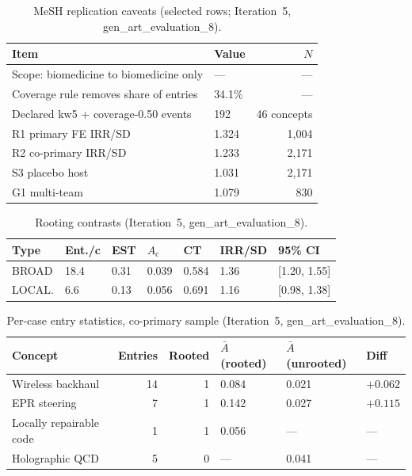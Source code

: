 \documentclass[11pt,letterpaper]{article}
\begin{document}
\begin{table}[!htbp]
\centering
\caption{MeSH replication caveats (selected rows; Iteration~5, gen\_art\_evaluation\_8).}
\label{tab:mesh_caveats}
{\small
\begin{tabular}{L{5.5cm}R{1.3cm}r}
\toprule
Item & Value & $N$ \\
\midrule
Scope: biomedicine to biomedicine only & --- & --- \\
Coverage rule removes share of entries & 34.1\% & --- \\
Declared kw5 + coverage-0.50 events & 192 & 46 concepts \\
R1 primary FE IRR/SD & 1.324 & 1,004 \\
R2 co-primary IRR/SD & 1.233 & 2,171 \\
S3 placebo host & 1.031 & 2,171 \\
G1 multi-team & 1.079 & 830 \\
\bottomrule
\end{tabular}
}
\end{table}

\begin{table}[!htbp]
\centering
\caption{Rooting contrasts (Iteration~5, gen\_art\_evaluation\_8).}
\label{tab:rooting}
{\footnotesize\setlength{\tabcolsep}{3pt}
\begin{tabular}{L{1.6cm}R{0.9cm}R{0.7cm}R{1.2cm}R{0.7cm}R{1.2cm}L{1.4cm}}
\toprule
Type & Ent./c & EST & $A_{\mathrm{c}}$ & CT & IRR/SD & 95\% CI \\
\midrule
BROAD & 18.4 & 0.31 & 0.039 & 0.584 & 1.36 & [1.20, 1.55] \\
LOCAL. & 6.6 & 0.13 & 0.056 & 0.691 & 1.16 & [0.98, 1.38] \\
\bottomrule
\end{tabular}
}
\end{table}

\begin{table}[!htbp]
\centering
\caption{Per-case entry statistics, co-primary sample (Iteration~5, gen\_art\_evaluation\_8).}
\label{tab:cases}
{\small
\begin{tabular}{L{3cm}rrR{1.5cm}R{1.5cm}R{1cm}}
\toprule
Concept & Entries & Rooted & $\bar{A}$ (rooted) & $\bar{A}$ (unrooted) & Diff \\
\midrule
Wireless backhaul & 14 & 1 & 0.084 & 0.021 & $+0.062$ \\
EPR steering & 7 & 1 & 0.142 & 0.027 & $+0.115$ \\
Locally repairable code & 1 & 1 & 0.056 & --- & --- \\
Holographic QCD & 5 & 0 & --- & 0.041 & --- \\
\bottomrule
\end{tabular}
}
\end{table}
\end{document}
